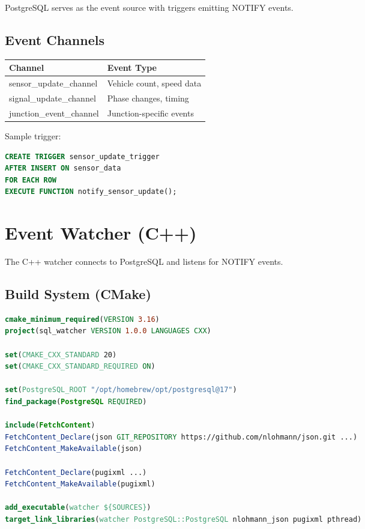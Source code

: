 \documentclass[12pt,a4paper]{article}
\begin{document}
PostgreSQL serves as the event source with triggers emitting NOTIFY events.

\subsection{Event Channels}

\begin{table}[H]
\centering
\begin{tabular}{ll} \toprule
Channel & Event Type \\ \midrule
sensor\_update\_channel & Vehicle count, speed data \\
signal\_update\_channel & Phase changes, timing \\
junction\_event\_channel & Junction-specific events \\ \bottomrule
\end{tabular}
\end{table}

Sample trigger:
\begin{lstlisting}[language=SQL,style=mystyle]
CREATE TRIGGER sensor_update_trigger
AFTER INSERT ON sensor_data
FOR EACH ROW
EXECUTE FUNCTION notify_sensor_update();
\end{lstlisting}

\section{Event Watcher (C++)}

The C++ watcher connects to PostgreSQL and listens for NOTIFY events.

\subsection{Build System (CMake)}

\begin{lstlisting}[language=CMake,style=mystyle]
cmake_minimum_required(VERSION 3.16)
project(sql_watcher VERSION 1.0.0 LANGUAGES CXX)

set(CMAKE_CXX_STANDARD 20)
set(CMAKE_CXX_STANDARD_REQUIRED ON)

set(PostgreSQL_ROOT "/opt/homebrew/opt/postgresql@17")
find_package(PostgreSQL REQUIRED)

include(FetchContent)
FetchContent_Declare(json GIT_REPOSITORY https://github.com/nlohmann/json.git ...)
FetchContent_MakeAvailable(json)

FetchContent_Declare(pugixml ...)
FetchContent_MakeAvailable(pugixml)

add_executable(watcher ${SOURCES})
target_link_libraries(watcher PostgreSQL::PostgreSQL nlohmann_json pugixml pthread)
\end{lstlisting}
\end{document}
